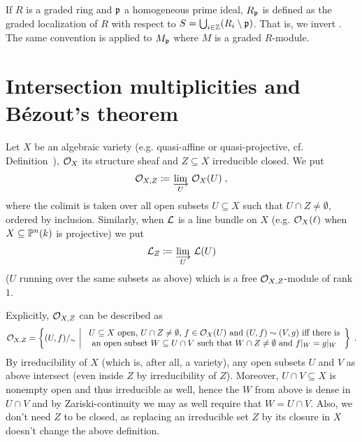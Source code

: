\documentclass[a4paper,parskip=half,numbers=enddot, DIV=12, headheight=30pt]{scrreprt}
\begin{document}
\begin{rem}
    If $R$ is a graded ring and $\mathfrak{p}$ a homogeneous prime ideal, $R_{\mathfrak{p}}$ is defined as the graded localization of $R$ with respect to $S=\bigcup_{i\in\mathbb{Z}} (R_i\setminus \mathfrak{p})$. That is, we invert . The same convention is applied to $M_{\mathfrak{p}}$ where $M$ is a graded $R$-module.
\end{rem}

\section{Intersection multiplicities and B\'ezout's theorem}


\begin{defi}
    Let $X$ be an algebraic variety (e.g. quasi-affine or quasi-projective, cf. Definition~), $\mathcal{O}_X$ its structure sheaf and $Z\subseteq X$ irreducible closed. We put 
    \begin{align*}
        \Oo_{X,Z}\coloneqq \colimit[U] \Oo_X(U)\;,
    \end{align*}
    where the colimit is taken over all open subsets $U\subseteq X$ such that $U\cap Z\neq\emptyset$, ordered by inclusion. Similarly, when $\mathcal{L}$ is a line bundle on $X$ (e.g. $\mathcal{O}_X(\ell)$ when $X\subseteq \mathbb{P}^n(k)$ is projective) we put
    \begin{align*}
    \Ll_Z\coloneqq\colimit[U] \Ll(U)
    \end{align*}
    ($U$ running over the same subsets as above) which is a free $\mathcal{O}_{X,Z}$-module of rank $1$.
\end{defi}
    
    Explicitly, $\mathcal{O}_{X,Z}$ can be described as
    \begin{align*}
    	\mathcal{O}_{X,Z}=\left\{(U,f)/_\sim\ \middle|\ 
    	\begin{array}{c}
    	U\subseteq X\text{ open, }U\cap Z\neq\emptyset\text{, }f\in\mathcal{O}_X(U)\text{ and }(U,f)\sim (V,g)\text{ iff there is}\\
    	\text{an open subset }W\subseteq U\cap V\text{ such that }W\cap Z\neq\emptyset\text{ and }f|_W=g|_W
    	\end{array}
    	\right\}\;.
    \end{align*}
    By  irreducibility of $X$ (which is, after all, a variety), any open subsets $U$ and $V$ as above intersect (even inside $Z$ by irreducibility of $Z$). Moreover, $U\cap V\subseteq X$ is nonempty open and thus irreducible as well, hence the $W$ from above is dense in $U\cap V$ and by Zariski-continuity we may as well require that $W=U\cap V$. Also, we don't need $Z$ to be closed, as replacing an irreducible set $Z$ by its closure in $X$ doesn't change the above definition.
    
\end{document}
